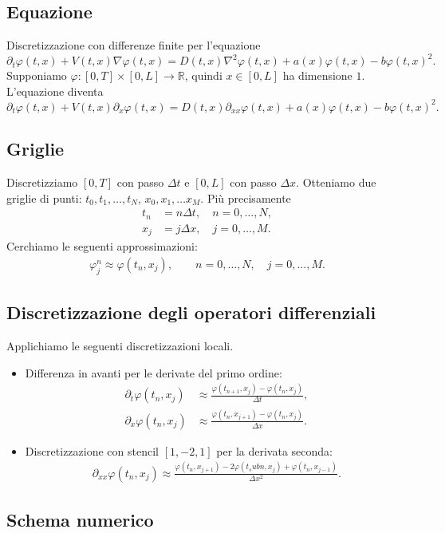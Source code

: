 \documentclass [11pt]{article}
\renewcommand{\phi}{\varphi}
\newcommand{\R}{\mathbb{R}}
\theoremstyle{definition}
\theoremstyle{definition}
\newcommand{ \sss }[1]{\subsection*{#1}}
\begin{document}
\sss{Equazione}
%
Discretizzazione con differenze finite per l'equazione
%
$$
	\partial_t \phi(t,x)+V(t,x)\nabla \phi(t,x)=D(t,x)\nabla^2 \phi(t,x) + 						a(x)\phi(t,x)-b\phi(t,x)^2.
$$	
%
Supponiamo $\phi:[0,T]\times [0,L]\to \R$, quindi $x\in[0,L]$ ha dimensione $1$. L'equazione diventa
%
$$
\partial_t \phi(t,x)+V(t,x)\partial_x \phi(t,x)=D(t,x)\partial_{xx} \phi(t,x) + 						a(x)\phi(t,x)-b\phi(t,x)^2.
$$	




\sss{Griglie}

Discretizziamo $[0,T]$ con passo $\Delta t$ e $[0,L]$	con passo $\Delta x$. Otteniamo due griglie di punti: $t_0,t_1,\dots,t_N$, $x_0,x_1,\dots x_M$. Più precisamente
%
\begin{align*}
	t_n&=n\Delta t,\quad n=0,\dots,N,\\ 
	x_j&=j\Delta x,\quad j=0,\dots,M.
\end{align*}
%	
Cerchiamo le seguenti approssimazioni:
%
\begin{align*}
\phi^n_j\approx \phi(t_n,x_j),\qquad n=0,\dots,N,\quad  j=0,\dots,M.	
\end{align*}	
%



\sss{Discretizzazione degli operatori differenziali}
Applichiamo le seguenti discretizzazioni locali.
\begin{itemize}
%	
	\item Differenza in avanti per le derivate del primo ordine:
%
	\begin{align*}
		\partial_t\phi (t_n,x_j)&\approx \frac{\phi(t_{n+1},x_j)-\phi(t_n,x_j) }{\Delta t},\\
		\partial_x\phi (t_n,x_j)&\approx \frac{\phi(t_n,x_{j+1})-\phi(t_n,x_j) }{\Delta x}.
	\end{align*}
%
	\item Discretizzazione con stencil $[1,-2,1]$ per la derivata seconda:
%
	\begin{align*}
	\partial_{xx}\phi(t_n,x_j)\approx \frac{\phi(t_n,x_{j+1})-2\phi(t_subn,x_j)+\phi(t_n,x_{j-1})}{\Delta x^2}.
	\end{align*}
%	
\end{itemize}
%

\newpage

\sss{Schema numerico}
\end{document}

